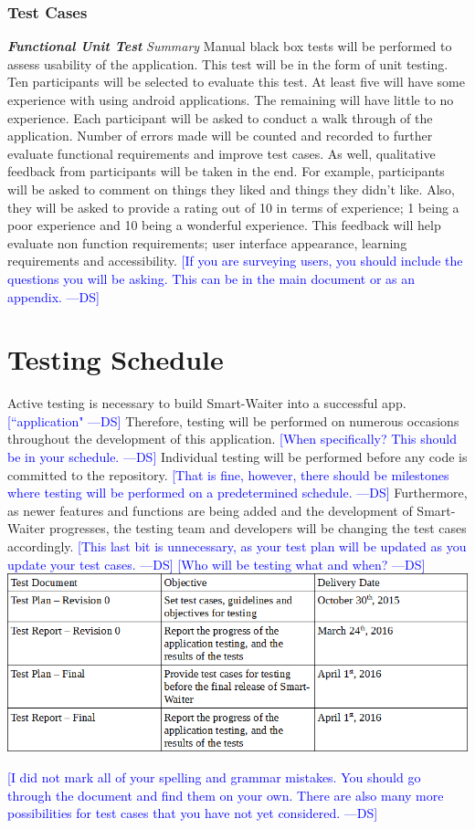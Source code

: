 \documentclass[12pt]{article}
\newcommand{\authornote}[3]{\textcolor{#1}{[#3 ---#2]}}
\newcommand{\authornote}[3]{}
\newcommand{\ds}[1]{\authornote{blue}{DS}{#1}}
\begin{document}
\subsubsection{Test Cases}
\textbf{\textit{Functional Unit Test}}\newline
\newline
\textit{Summary}\newline
Manual black box tests will be performed to assess usability of the application. This test will be in the form of unit testing. Ten participants will be selected to evaluate this test. At least five will have some experience with using android applications. The remaining will have little to no experience. Each participant will be asked to conduct a walk through of the application. Number of errors made will be counted and recorded to further evaluate functional requirements and improve test cases. As well, qualitative feedback from participants will be taken in the end. For example, participants will be asked to comment on things they liked and things they didn't like. Also, they will be asked to provide a rating out of 10 in terms of experience; 1 being a poor experience and 10 being a wonderful experience. This feedback will help evaluate non function requirements; user interface appearance, learning requirements and accessibility. 
\ds{If you are surveying users, you should include the questions you will be asking.
This can be in the main document or as an appendix.}
\newline

\section{Testing Schedule}
Active testing is necessary to build Smart-Waiter into a successful app.
\ds{``application"}
Therefore, testing will be performed on numerous occasions throughout the development of this application. 
\ds{When specifically? This should be in your schedule.}
Individual testing will be performed before any code is committed to the repository.
\ds{That is fine, however, there should be milestones where testing will be performed 
on a predetermined schedule.}
Furthermore, as newer features and functions are being added and the development of Smart-Waiter progresses, the testing team and developers will be changing the test cases accordingly. 
\ds{This last bit is unnecessary, as your test plan will be updated as you
update your test cases.}
\newline
\ds{Who will be testing what and when?}
\newline
\includegraphics[width=\textwidth,height=\textheight,keepaspectratio]{TestingSchedule.png}

\ds{I did not mark all of your spelling and grammar mistakes. You should go 
through the document and find them on your own. There are also many more possibilities
for test cases that you have not yet considered.}
\end{document}
